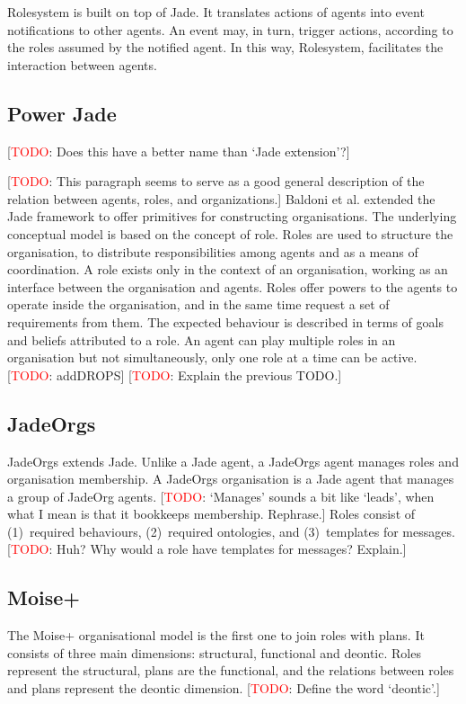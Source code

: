 \documentclass{article}
\newcommand{\todo}[1]{[\textcolor{red}{TODO}: #1]}
\begin{document}
Rolesystem is built on top of Jade. It translates actions of
agents into event notifications to other agents. An event may,
in turn, trigger actions, according to the roles assumed by
the notified agent. In this way, Rolesystem, facilitates the
interaction between agents.

\subsection{Power Jade}

\todo{Does this have a better name than `Jade extension'?}

\todo{This paragraph seems to serve as a good general description of the
relation between agents, roles, and organizations.} Baldoni et al.
\cite{conf/mates/BaldoniBGGT08} extended the Jade framework to offer primitives
for constructing organisations. The underlying conceptual model is based on the
concept of role. Roles are used to structure the organisation, to distribute
responsibilities among agents and as a means of coordination. A role exists
only in the context of an organisation, working as an interface between the
organisation and agents. Roles offer powers to the agents to operate inside the
organisation, and in the same time request a set of requirements from them. The
expected behaviour is described in terms of goals and beliefs attributed to a
role. An agent can play multiple roles in an organisation but not
simultaneously, only one role at a time can be active.  \todo{addDROPS}
\todo{Explain the previous TODO.}

\subsection{JadeOrgs}

JadeOrgs \cite{madrigal2009adding} extends Jade. Unlike a Jade agent, a
JadeOrgs agent manages roles and organisation membership. A JadeOrgs
organisation is a Jade agent that manages a group of JadeOrg agents.
\todo{`Manages' sounds a bit like `leads', when what I mean is that it
bookkeeps membership. Rephrase.} Roles consist of (1)~required behaviours,
(2)~required ontologies, and (3)~templates for messages. \todo{Huh? Why would a
role have templates for messages? Explain.}

\subsection{Moise+} 

The Moise+ \cite{} organisational model is the first one to join roles
with plans. It consists of three main dimensions: structural,
functional and deontic. Roles represent the structural, plans
are the functional, and the relations between roles and
plans represent the deontic dimension. \todo{Define the word
`deontic'.}
\end{document}
